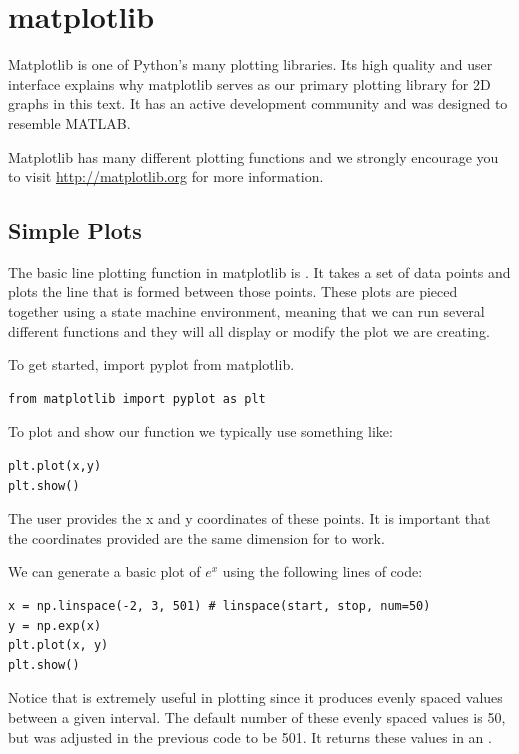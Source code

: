 \label{lab:Matplotlib_and_Mayavi}

\section*{matplotlib}
Matplotlib is one of Python's many plotting libraries. Its high quality
and user interface explains why matplotlib serves as our primary
plotting library for 2D graphs in this text. It has an active
development community and was designed to resemble MATLAB.

Matplotlib has many different plotting functions and we strongly
encourage you to visit \url{http://matplotlib.org} for more
information.

\subsection*{Simple Plots} 
The basic line plotting function in matplotlib is . It takes a
set of data points and plots the line that is formed between those points. 
These plots are pieced together using a state machine environment, meaning that 
we can run several different functions and they will all display or modify the 
plot we are creating. 

To get started, import pyplot from matplotlib.
\begin{lstlisting} 
from matplotlib import pyplot as plt
\end{lstlisting}

To plot and show our function we typically use something like:
\begin{lstlisting} 
plt.plot(x,y) 
plt.show() 
\end{lstlisting}

The user provides the x and y coordinates of these points. It is important that the 
coordinates provided are the same dimension for  to work. 

We can generate a basic plot of $e^x$ using the following lines of code:
\begin{lstlisting}
x = np.linspace(-2, 3, 501) # linspace(start, stop, num=50)  
y = np.exp(x)
plt.plot(x, y)
plt.show() 
\end{lstlisting}

Notice that  is extremely useful in plotting since it produces evenly spaced values between a given interval. The default number of these evenly spaced values is 50, but was adjusted in the previous code to be 501. It returns these values in an . 

